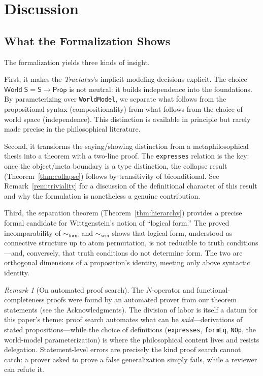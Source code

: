 \documentclass[jsl,bibother]{asl}
\theoremstyle{definition}
\theoremstyle{remark}
\newtheorem{remark}[theorem]{Remark}
\newcommand{\Sach}{\mathsf{S}}
\newcommand{\World}{\mathsf{World}}
\newcommand{\Prop}{\mathsf{Prop}}
\newcommand{\formEq}{\sim_{\mathrm{form}}}
\newcommand{\semEq}{\sim_{\mathrm{sem}}}
\begin{document}
\section{Discussion}
\label{sec:discussion}

\subsection{What the Formalization Shows}
\label{sec:shows}

The formalization yields three kinds of insight.

First, it makes the \emph{Tractatus}'s implicit modeling
decisions explicit.  The choice $\World\;\Sach = \Sach \to
\Prop$ is not neutral: it builds independence into the
foundations.  By parameterizing over \texttt{WorldModel}, we
separate what follows from the propositional syntax (compositionality)
from what follows from the choice of world space (independence).
This distinction is available in principle but rarely made
precise in the philosophical literature.

Second, it transforms the saying/showing distinction from a
metaphilosophical thesis into a theorem with a two-line proof.
The \texttt{expresses} relation is the key: once the
object/meta boundary is a type distinction, the collapse result
(Theorem~\ref{thm:collapse}) follows by transitivity of
biconditional.  See Remark~\ref{rem:triviality} for a
discussion of the definitional character of this result and
why the formulation is nonetheless a genuine contribution.

Third, the separation theorem (Theorem~\ref{thm:hierarchy})
provides a precise formal candidate for Wittgenstein's
notion of ``logical form.''  The proved incomparability of
$\formEq$ and $\semEq$ shows that logical form, understood as
connective structure up to atom permutation, is not reducible to
truth conditions---and, conversely, that truth conditions do not
determine form.  The two are orthogonal dimensions of a
proposition's identity, meeting only above syntactic identity.

\begin{remark}[On automated proof search]
\label{rem:automation}
The $N$-operator and functional-completeness proofs were found
by an automated prover from our theorem statements (see the
Acknowledgments).  The division of labor is itself a datum for
this paper's theme: proof search automates what can be
\emph{said}---derivations of stated propositions---while the
choice of definitions (\texttt{expresses}, \texttt{formEq},
\texttt{NOp}, the world-model parameterization) is where the
philosophical content lives and resists delegation.
Statement-level errors are precisely the kind proof search
cannot catch: a prover asked to prove a false generalization
simply fails, while a reviewer can refute it.
\end{remark}
\end{document}
